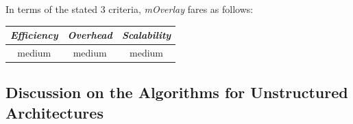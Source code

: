 %
In terms of the stated $3$ criteria, \emph{mOverlay} fares as follows:
\begin{center}
{\footnotesize
\begin{tabular}{ccc}
\emph{Efficiency} & \emph{Overhead} & \emph{Scalability} \\
\hline
medium &
medium &
medium
\end{tabular}
}
\end{center}

\subsection{Discussion on the Algorithms for Unstructured Architectures}




